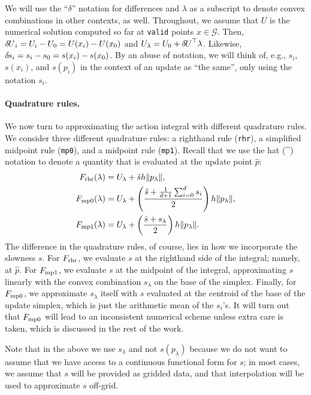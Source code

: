 \documentclass[smallcondensed]{svjour3}
\begin{document}
We will use the ``$\delta$'' notation for differences and $\lambda$ as
a subscript to denote convex combinations in other contexts, as
well. Throughout, we assume that $U$ is the numerical solution
computed so far at \texttt{valid} points $x \in \mathcal{G}$. Then,
${\delta \hspace{-0.09em} U}_i = U_i - U_0 = U(x_i) - U(x_0)$ and
$U_\lambda = U_0 + {\delta \hspace{-0.09em} U}^\top \lambda$. Likewise,
${\delta \hspace{-0.1em} s}_i = s_i - s_0 = s(x_i) - s(x_0)$. By an abuse of notation, we
will think of, e.g., $s_i$, $s(x_i)$, and $s(p_i)$ in the context of
an update as ``the same'', only using the notation $s_i$.

\paragraph{Quadrature rules.} We now turn to approximating the action
integral with different quadrature rules. We consider three different
quadrature rules: a righthand rule (\texttt{rhr}), a simplified
midpoint rule (\texttt{mp0}), and a midpoint rule
(\texttt{mp1}). Recall that we use the hat (\^{}) notation to denote a
quantity that is evaluated at the update point $\hat{p}$:
\begin{align}
  F_{\operatorname{rhr}}(\lambda) &= U_\lambda + \hat{s} h \|p_\lambda\|, \\
  F_{\operatorname{mp0}}(\lambda) &= U_\lambda + \left(\frac{\hat{s} + \tfrac{1}{d+1} \sum_{i=0}^d s_i}{2}\right) h \|p_\lambda\|, \\
  F_{\operatorname{mp1}}(\lambda) &= U_\lambda + \left(\frac{\hat{s} + s_\lambda}{2}\right) h \|p_\lambda\|.
\end{align}
The difference in the quadrature rules, of course, lies in how we
incorporate the slowness $s$. For $F_{\operatorname{rhr}}$, we evaluate $s$ at the
righthand side of the integral; namely, at $\hat{p}$. For $F_{\operatorname{mp1}}$,
we evaluate $s$ at the midpoint of the integral, approximating $s$
linearly with the convex combination $s_\lambda$ on the base of the
simplex. Finally, for $F_{\operatorname{mp0}}$, we approximate $s_\lambda$ itself
with $s$ evaluated at the centroid of the base of the update simplex,
which is just the arithmetic mean of the $s_i$'s. It will turn out
that $F_{\operatorname{mp0}}$ will lead to an inconsistent numerical scheme unless
extra care is taken, which is discussed in the rest of the work.

Note that in the above we use $s_\lambda$ and not $s(p_\lambda)$
because we do not want to assume that we have access to a continuous
functional form for $s$; in most cases, we assume that $s$ will be
provided as gridded data, and that interpolation will be used to
approximate $s$ off-grid.
\end{document}
